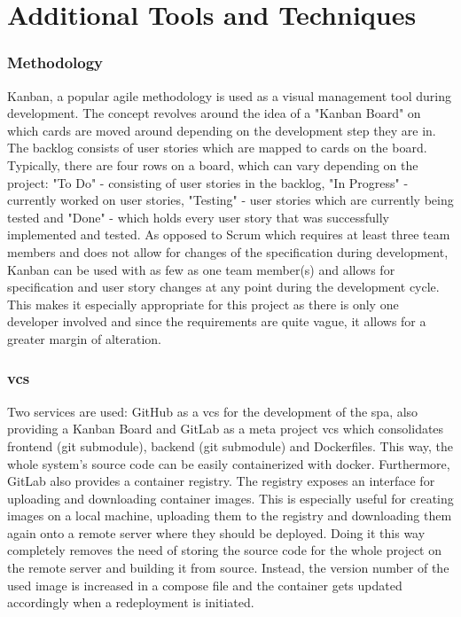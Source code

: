 \section{Additional Tools and Techniques}
\subsubsection{Methodology}
Kanban, a popular agile methodology is used as a visual management tool during development. The concept revolves around the idea of a "Kanban Board" on which cards are moved around depending on the development step they are in. The backlog consists of user stories which are mapped to cards on the board. Typically, there are four rows on a board, which can vary depending on the project: "To Do" - consisting of user stories in the backlog, "In Progress" - currently worked on user stories, "Testing" - user stories which are currently being tested and "Done" - which holds every user story that was successfully implemented and tested. As opposed to Scrum which requires at least three team members and does not allow for changes of the specification during development, Kanban can be used with as few as one team member(s) and allows for specification and user story changes at any point during the development cycle. This makes it especially appropriate for this project as there is only one developer involved and since the requirements are quite vague, it allows for a greater margin of alteration.


\subsubsection[\acrlong{vcs}]{\acrlong{vcs}}
Two services are used: GitHub as a \acrfull{vcs} for the development of the \acrshort{spa}, also providing a Kanban Board and GitLab as a meta project \acrshort{vcs} which consolidates frontend (git submodule), backend (git submodule) and Dockerfiles. This way, the whole system's source code can be easily containerized with docker. Furthermore, GitLab also provides a container registry. The registry exposes an interface for uploading and downloading container images. This is especially useful for creating images on a local machine, uploading them to the registry and downloading them again onto a remote server where they should be deployed. Doing it this way completely removes the need of storing the source code for the whole project on the remote server and building it from source. Instead, the version number of the used image is increased in a compose file and the container gets updated accordingly when a redeployment is initiated.

